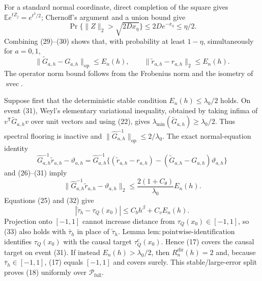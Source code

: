 For a standard normal coordinate, direct completion of the square gives \(\mathbb Ee^{tZ_j}=e^{t^2/2}\); Chernoff's argument and a union bound give
\[
 \Pr\{\|Z\|_2>\sqrt{2Dx_\eta}\}\le2De^{-x_\eta}\le\eta/2.
\tag{30}
\]
Combining (29)--(30) shows that, with probability at least \(1-\eta\), simultaneously for \(a=0,1\),
\[
 \|\widetilde G_{a,h}-G_{a,h}\|_{\mathrm{op}}
 \le E_n(h),
 \qquad
 \|\widetilde r_{a,h}-r_{a,h}\|_2\le E_n(h).
\tag{31}
\]
The operator norm bound follows from the Frobenius norm and the isometry of \(\operatorname{svec}\).

Suppose first that the deterministic stable condition \(E_n(h)\le\lambda_0/2\) holds.  On event (31), Weyl's elementary variational inequality, obtained by taking infima of \(v^{\mathsf T}\widetilde G_{a,h}v\) over unit vectors and using (22), gives \(\lambda_{\min}(\widetilde G_{a,h})\ge\lambda_0/2\).  Thus spectral flooring is inactive and \(\|\widehat G_{a,h}^{-1}\|_{\mathrm{op}}\le2/\lambda_0\).  The exact normal-equation identity
\[
 \widehat G_{a,h}^{-1}\widetilde r_{a,h}-\vartheta_{a,h}
 =\widehat G_{a,h}^{-1}
 \{(\widetilde r_{a,h}-r_{a,h})
   -(\widetilde G_{a,h}-G_{a,h})\vartheta_{a,h}\}
\]
and (26)--(31) imply
\[
 \|\widehat G_{a,h}^{-1}\widetilde r_{a,h}-\vartheta_{a,h}\|_2
 \le \frac{2(1+C_\theta)}{\lambda_0}E_n(h).
\tag{32}
\]
Equations (25) and (32) give
\[
 |\check\tau_h-\tau_Q(x_0)|\le C_bh^\beta+C_vE_n(h).
\tag{33}
\]
Projection onto \([-1,1]\) cannot increase distance from \(\tau_Q(x_0)\in[-1,1]\), so (33) also holds with \(\bar\tau_h\) in place of \(\check\tau_h\).  Lemma \(\mathrm{lem{:}pointwise\text{-}identification}\) identifies \(\tau_Q(x_0)\) with the causal target \(\tau_Q^{\mathrm c}(x_0)\).  Hence (17) covers the causal target on event (31).  If instead \(E_n(h)>\lambda_0/2\), then \(R_n^{\mathrm{dir}}(h)=2\) and, because \(\bar\tau_h\in[-1,1]\), (17) equals \([-1,1]\) and covers surely.  This stable/large-error split proves (18) uniformly over \(\mathcal P_{\mathrm{full}}\).

